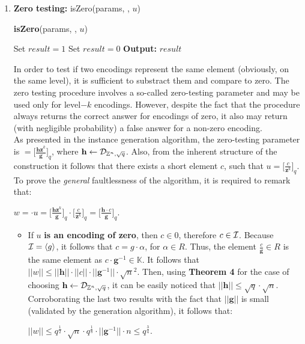 \begin{enumerate}[label=(\alph*)]

\item \textbf{Zero testing: } isZero(params, \pzt, $u$)

\begin{tcolorbox}[colframe=black,colback=white,arc=0pt,outer arc=0pt]
	\begin{center}
		 \textbf{isZero}(params, \pzt, $u$)
	\end{center}
	\begin{algorithmic}[1]
		\State Set $result = 1$
		\Else
		\State Set $result = 0$
		\EndIf
		\State \textbf{Output: } $result$
	\end{algorithmic}
\end{tcolorbox}


In order to test if two encodings represent the same element (obviously, on the same level), it is sufficient to substract them and compare to zero. The zero testing procedure involves a so-called zero-testing parameter and may be used only for level$-k$ encodings. However, despite the fact that the procedure always returns the correct answer for encodings of zero, it also may return (with negligible probability) a false answer for a non-zero encoding. \\

As presented in the instance generation algorithm, the zero-testing parameter is \pzt$=\big[\frac{\textbf{hz}^k}{\textbf{g}}\big]_q$, where $\textbf{h}\leftarrow \mathcal{D}_{{\mathbb Z}^n, \sqrt{q}}$. Also, from the inherent structure of the construction it follows that there exists a short element $c$, such that $u = \big[\frac{c}{\textbf{z}^k}\big]_q$. To prove the \textit{general} faultlessness of the algorithm, it is required to remark that:
\begin{center}
	$w=$\pzt$\cdot u = \big[\frac{\textbf{hz}^k}{\textbf{g}}\big]_q \cdot \big[\frac{c}{\textbf{z}^k}\big]_q = \big[ \frac{\textbf{h}\cdot c}{\textbf{g}}\big]_q $.
\end{center}

\begin{itemize}
	\item If $u$ \textbf{is an encoding of zero}, then $c \in \hat{0}$, therefore $c \in \mathcal{I}$. Because $\mathcal{I} = \langle g \rangle$, it follows that $c = g \cdot \alpha$, for $\alpha \in R$. Thus, the element $\frac{c}{\textbf{g}}\in R$ is the same element as $c \cdot \textbf{g}^{-1} \in \mathbb{K}$. It follows that $||w||\leq ||\textbf{h}|| \cdot || c || \cdot ||\textbf{g}^{-1}|| \cdot \sqrt{n}^2$. Then, using \textbf{Theorem 4} for the case of choosing $\textbf{h} \leftarrow \mathcal{D}_{{\mathbb Z}^n, \sqrt{q}}$, it can be easily noticed that $||\textbf{h}|| \leq \sqrt{q} \cdot \sqrt{n}$. Corroborating the last two results with the fact that $||\textbf{g}||$ is small (validated by the generation algorithm), it follows that:
	\begin{center}
		$||w|| \leq q^{\frac{1}{2}} \cdot \sqrt{n} \cdot q^{\frac{1}{8}} \cdot ||\textbf{g}^{-1}|| \cdot n  \leq q^{\frac{3}{4}}$.
	\end{center}


\end{itemize}
\end{enumerate}
